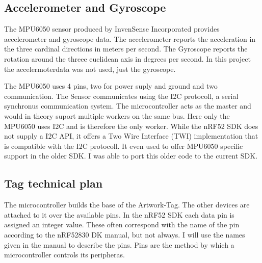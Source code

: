 \subsection{Accelerometer and Gyroscope}
The MPU6050 sensor produced by InvenSense Incorporated provides accelerometer and gyroscope data.
The accelerometer reports the acceleration in the three cardinal directions in meters per second.
The Gyroscope reports the rotation around the threee euclidean axis in degrees per second.
In this project the accelermoterdata was not used, just the gyroscope.

The MPU6050 uses 4 pins, two for power suply and ground and two communication.
The Sensor communicates using the I2C protocoll, a serial synchronus communication system.
The microcontroller acts as the master and would in theory suport multiple workers on the same bus. 
Here only the MPU6050 uses I2C and is therefore the only worker.
While the nRF52 SDK does not supply a I2C API, it offers a Two Wire Interface (TWI) implementation that is compatible with the I2C protocoll.
It even used to offer MPU6050 specific support in the older SDK. 
I was able to port this older code to the current SDK.

\subsection{Tag technical plan}
The microcontroller builds the base of the Artwork-Tag. 
The other devices are attached to it over the available pins.
In the nRF52 SDK each data pin is assigned an integer value. 
These often correspond with the name of the pin according to the nRF52830 DK manual, but not always.
I will use the names given in the manual to describe the pins.
Pins are the method by which a microcontroller controls its peripheras.


